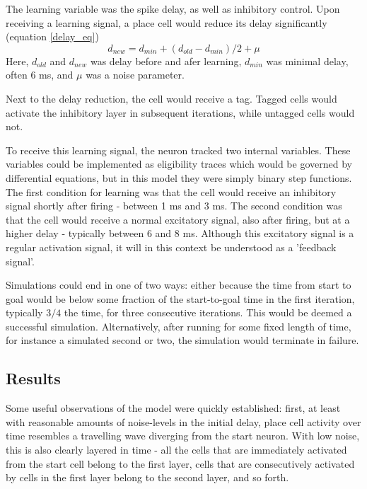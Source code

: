 \documentclass{article}
\begin{document}
    The learning variable was the spike delay, as well as inhibitory control. Upon receiving a learning signal, a place cell would reduce its delay significantly (equation \ref{delay_eq})
        \begin{equation}\label{delay_eq} d_{new} = d_{min} + (d_{old}-d_{min})/2 + \mu \end{equation}
    Here, \(d_{old}\) and \(d_{new}\) was delay before and afer learning, \(d_{min}\) was minimal delay, often 6 ms, and \(\mu\) was a noise parameter.

    Next to the delay reduction, the cell would receive a tag. Tagged cells would activate the inhibitory layer in subsequent iterations, while untagged cells would not.

    To receive this learning signal, the neuron tracked two internal variables. These variables could be implemented as eligibility traces which would be governed by differential equations, but in this model they were simply binary step functions. The first condition for learning was that the cell would receive an inhibitory signal shortly after firing - between 1 ms and 3 ms. The second condition was that the cell would receive a normal excitatory signal, also after firing, but at a higher delay - typically between 6 and 8 ms. Although this excitatory signal is a regular activation signal, it will in this context be understood as a 'feedback signal'.

    Simulations could end in one of two ways: either because the time from start to goal would be below some fraction of the start-to-goal time in the first iteration, typically \(3/4\) the time, for three consecutive iterations. This would be deemed a successful simulation. Alternatively, after running for some fixed length of time, for instance a simulated second or two, the simulation would terminate in failure.

    \subsection{Results}
    Some useful observations of the model were quickly established: first, at least with reasonable amounts of noise-levels in the initial delay, place cell activity over time resembles a travelling wave diverging from the start neuron. With low noise, this is also clearly layered in time - all the cells that are immediately activated from the start cell belong to the first layer, cells that are consecutively activated by cells in the first layer belong to the second layer, and so forth.
\end{document}
